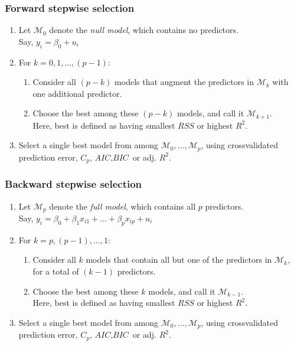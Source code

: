 \documentclass{beamer}
\begin{document}
\begin{frame}
\frametitle{Forward stepwise selection}

\begin{enumerate}
  \item Let $\mathcal{M}_0$ denote the \textit{null model}, which contains no predictors.
  \\Say, $y_i=\beta_0+u_i$
  \item For $k=0,1, \dots , \left(p-1\right)$:
\begin{enumerate}[{(a)}]
  \item Consider all $(p-k)$ models that augment the predictors in $\mathcal{M}_k$ with one additional predictor.
  \item Choose the best among these $(p-k)$ models, and call it $\mathcal{M}_{k+1}$.
        \\Here, best is defined as having smallest $\textit{RSS}$ or highest $R^2$.
\end{enumerate}
  \item Select a single best model from among $\mathcal{M}_0, \dots, \mathcal{M}_{p}$, using crossvalidated
prediction error, $C_p$, $\textit{AIC}, \textit{BIC}$ or adj. $R^2$.
\end{enumerate}

\end{frame}

\begin{frame}
\frametitle{Backward stepwise selection}

\begin{enumerate}
  \item Let $\mathcal{M}_p$ denote the \textit{full model}, which contains all $p$ predictors.
  \\Say, $y_i=\beta_0+ \beta_1x_{i1} + \dots + \beta_px_{ip} + u_i$
  \item For $k=p, (p-1), \dots , 1$:
\begin{enumerate}[{(a)}]
  \item Consider all $k$ models that contain all but one of the predictors
in $\mathcal{M}_k$, for a total of $(k-1)$ predictors.
  \item Choose the best among these $k$ models, and call it $\mathcal{M}_{k-1}$.
        \\Here, best is defined as having smallest $\textit{RSS}$ or highest $R^2$.
\end{enumerate}
  \item Select a single best model from among $\mathcal{M}_0, \dots, \mathcal{M}_{p}$, using crossvalidated
prediction error, $C_p$, $\textit{AIC}, \textit{BIC}$ or adj. $R^2$.
\end{enumerate}

\end{frame}
\end{document}
